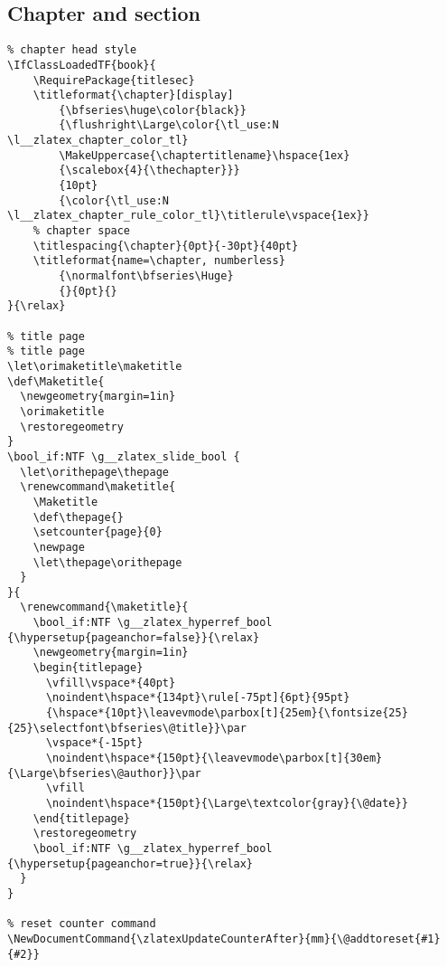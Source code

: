 \subsection{Chapter and section}
\begin{verbatim}
% chapter head style
\IfClassLoadedTF{book}{
    \RequirePackage{titlesec}
    \titleformat{\chapter}[display]
        {\bfseries\huge\color{black}}
        {\flushright\Large\color{\tl_use:N \l__zlatex_chapter_color_tl}
        \MakeUppercase{\chaptertitlename}\hspace{1ex}
        {\scalebox{4}{\thechapter}}}
        {10pt}
        {\color{\tl_use:N \l__zlatex_chapter_rule_color_tl}\titlerule\vspace{1ex}}
    % chapter space
    \titlespacing{\chapter}{0pt}{-30pt}{40pt}
    \titleformat{name=\chapter, numberless}
        {\normalfont\bfseries\Huge}
        {}{0pt}{}
}{\relax}

% title page
% title page
\let\orimaketitle\maketitle
\def\Maketitle{
  \newgeometry{margin=1in}
  \orimaketitle
  \restoregeometry
}
\bool_if:NTF \g__zlatex_slide_bool {
  \let\orithepage\thepage
  \renewcommand\maketitle{
    \Maketitle
    \def\thepage{}
    \setcounter{page}{0}
    \newpage
    \let\thepage\orithepage
  }
}{
  \renewcommand{\maketitle}{
    \bool_if:NTF \g__zlatex_hyperref_bool {\hypersetup{pageanchor=false}}{\relax}
    \newgeometry{margin=1in}
    \begin{titlepage}
      \vfill\vspace*{40pt}
      \noindent\hspace*{134pt}\rule[-75pt]{6pt}{95pt}
      {\hspace*{10pt}\leavevmode\parbox[t]{25em}{\fontsize{25}{25}\selectfont\bfseries\@title}}\par
      \vspace*{-15pt}
      \noindent\hspace*{150pt}{\leavevmode\parbox[t]{30em}{\Large\bfseries\@author}}\par
      \vfill
      \noindent\hspace*{150pt}{\Large\textcolor{gray}{\@date}}
    \end{titlepage}
    \restoregeometry
    \bool_if:NTF \g__zlatex_hyperref_bool {\hypersetup{pageanchor=true}}{\relax}
  }
}

% reset counter command
\NewDocumentCommand{\zlatexUpdateCounterAfter}{mm}{\@addtoreset{#1}{#2}}
\end{verbatim}